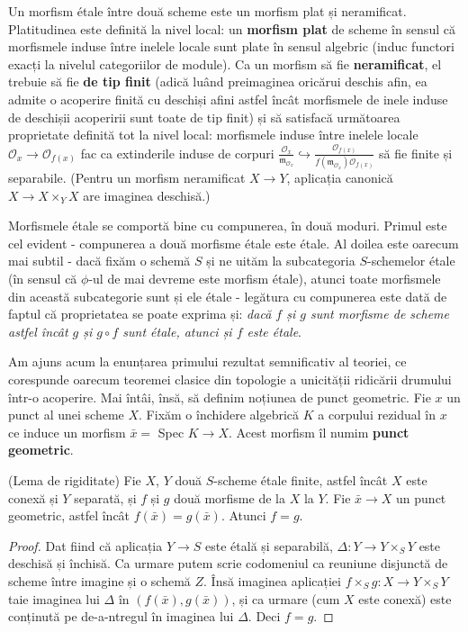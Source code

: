 \documentclass[13pt,openany]{book}
\begin{document}
Un morfism étale între două scheme este un morfism plat și neramificat. Platitudinea este definită la nivel local: un {\bf morfism plat} de scheme în sensul că morfismele induse între inelele locale sunt plate în sensul algebric (induc functori exacți la nivelul categoriilor de module). Ca un morfism să fie {\bf neramificat}, el trebuie să fie {\bf de tip finit} (adică luând preimaginea oricărui deschis afin, ea admite o acoperire finită cu deschiși afini astfel încât morfismele de inele induse de deschișii acoperirii sunt toate de tip finit) și să satisfacă următoarea proprietate definită tot la nivel local: morfismele induse între inelele locale $\mathcal{O}_x \rightarrow \mathcal{O}_{f(x)}$ fac ca extinderile induse de corpuri $\frac{\mathcal{O}_x}{\mathfrak{m}_{\mathcal{O}_x}} \hookrightarrow \frac{\mathcal{O}_{f(x)}}{f(\mathfrak{m}_{\mathcal{O}_x})\mathcal{O}_{f(x)}}$ să fie finite și separabile. (Pentru un morfism neramificat $X \rightarrow Y$, aplicația canonică $X \rightarrow X\times_Y X$ are imaginea deschisă.)

Morfismele étale se comportă bine cu compunerea, în două moduri. Primul este cel evident - compunerea a două morfisme étale este étale. Al doilea este oarecum mai subtil - dacă fixăm o schemă $S$ și ne uităm la subcategoria $S$-schemelor étale (în sensul că $\phi$-ul de mai devreme este morfism étale), atunci toate morfismele din această subcategorie sunt și ele étale - legătura cu compunerea este dată de faptul că proprietatea se poate exprima și: {\it dacă $f$ și $g$ sunt morfisme de scheme astfel încât $g$ și $g \circ f$ sunt étale, atunci și $f$ este étale}.

Am ajuns acum la enunțarea primului rezultat semnificativ al teoriei, ce corespunde oarecum teoremei clasice din topologie a unicității ridicării drumului într-o acoperire. Mai întâi, însă, să definim noțiunea de punct geometric. Fie $x$ un punct al unei scheme $X$. Fixăm o închidere algebrică $K$ a corpului rezidual în $x$ ce induce un morfism $\bar{x}=$ Spec $K\rightarrow X$. Acest morfism îl numim {\bf punct geometric}.

\begin{lema}
(Lema de rigiditate) Fie $X$, $Y$ două $S$-scheme étale finite, astfel încât $X$ este conexă și $Y$ separată, și $f$ și $g$ două morfisme de la $X$ la $Y$. Fie $\bar{x} \rightarrow X$ un punct geometric, astfel încât $f(\bar{x})=g(\bar{x})$. Atunci $f=g$.
\end{lema}

\begin{proof}
Dat fiind că aplicația $Y \rightarrow S$ este étală și separabilă, $\Delta : Y \rightarrow Y \times_S Y$ este deschisă și închisă. Ca urmare putem scrie codomeniul ca reuniune disjunctă de scheme între imagine și o schemă $Z$. Însă imaginea aplicației $f \times_S g: X \rightarrow Y \times_S Y$ taie imaginea lui $\Delta$ în $(f(\bar{x}),g(\bar{x}))$, și ca urmare (cum $X$ este conexă) este conținută pe de-a-ntregul în imaginea lui $\Delta$. Deci $f=g$.
\end{proof}
\end{document}
